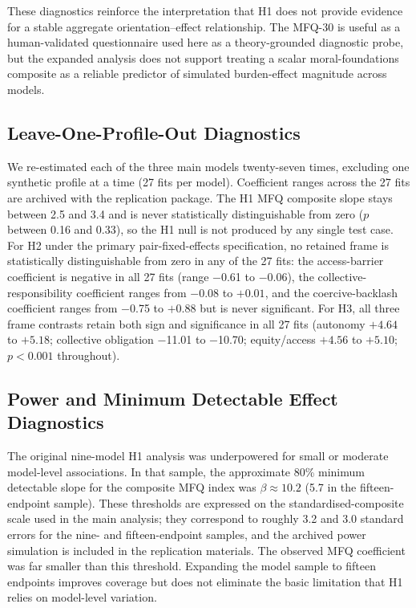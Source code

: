 \documentclass[11pt]{article}
\begin{document}
These diagnostics reinforce the interpretation that H1 does not provide evidence for a stable aggregate orientation--effect relationship. The MFQ-30 is useful as a human-validated questionnaire used here as a theory-grounded diagnostic probe, but the expanded analysis does not support treating a scalar moral-foundations composite as a reliable predictor of simulated burden-effect magnitude across models.


\subsection{Leave-One-Profile-Out Diagnostics}

We re-estimated each of the three main models twenty-seven times, excluding one synthetic profile at a time (27 fits per model). Coefficient ranges across the 27 fits are archived with the replication package. The H1 MFQ composite slope stays between 2.5 and 3.4 and is never statistically distinguishable from zero ($p$ between 0.16 and 0.33), so the H1 null is not produced by any single test case. For H2 under the primary pair-fixed-effects specification, no retained frame is statistically distinguishable from zero in any of the 27 fits: the access-barrier coefficient is negative in all 27 fits (range $-$0.61 to $-$0.06), the collective-responsibility coefficient ranges from $-$0.08 to $+0.01$, and the coercive-backlash coefficient ranges from $-$0.75 to $+0.88$ but is never significant. For H3, all three frame contrasts retain both sign and significance in all 27 fits (autonomy $+4.64$ to $+5.18$; collective obligation $-$11.01 to $-$10.70; equity/access $+4.56$ to $+5.10$; $p<0.001$ throughout).

\subsection{Power and Minimum Detectable Effect Diagnostics}
\label{app:h1-power}

The original nine-model H1 analysis was underpowered for small or moderate model-level associations. In that sample, the approximate 80\% minimum detectable slope for the composite MFQ index was \(\beta \approx 10.2\) (5.7 in the fifteen-endpoint sample). These thresholds are expressed on the standardised-composite scale used in the main analysis; they correspond to roughly 3.2 and 3.0 standard errors for the nine- and fifteen-endpoint samples, and the archived power simulation is included in the replication materials. The observed MFQ coefficient was far smaller than this threshold. Expanding the model sample to fifteen endpoints improves coverage but does not eliminate the basic limitation that H1 relies on model-level variation.
\end{document}
